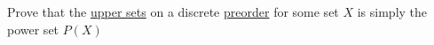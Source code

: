 
Prove that the \href{doc/1 math/Seven Sketches in Compositionality/1 Generative Effects/3 Preorders/Upper set}{upper sets} on a discrete \href{doc/1 math/Seven Sketches in Compositionality/1 Generative Effects/3 Preorders/1 Preorder}{preorder} for some set $X$ is simply the power set $P(X)$